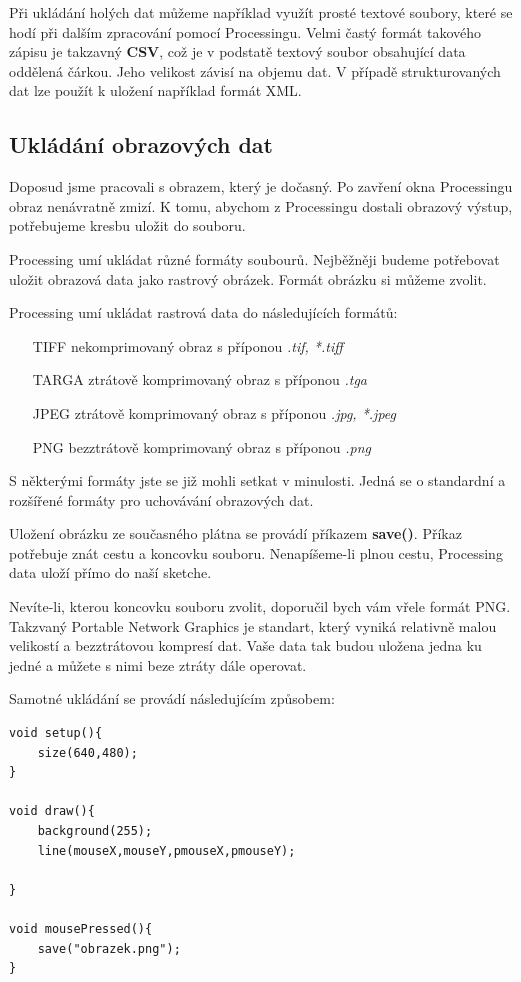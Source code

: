 \documentclass[10pt]{book}
\newcommand{\pododdil}[1]{\subsection{#1}\index{#1}\label{#1}}
\newcommand{\slovnik}[1]{\textbf{\gls{#1}}\index{#1}\label{#1}}
\begin{document}
Při ukládání holých dat můžeme například využít prosté textové soubory, které se hodí při dalším zpracování pomocí Processingu. Velmi častý formát takového zápisu je takzavný \slovnik{CSV}, což je v podstatě textový soubor obsahující data oddělená čárkou. Jeho velikost závisí na objemu dat. V případě strukturovaných dat lze použít k uložení například formát XML.


\pododdil{Ukládání obrazových dat}

Doposud jsme pracovali s obrazem, který je dočasný. Po zavření okna Processingu obraz nenávratně zmizí. K tomu, abychom z Processingu dostali obrazový výstup, potřebujeme kresbu uložit do souboru.

Processing umí ukládat různé formáty soubourů. Nejběžněji budeme potřebovat uložit obrazová data jako rastrový obrázek. Formát obrázku si můžeme zvolit.

Processing umí ukládat rastrová data do následujících formátů:


\begin{itemize}
\item[TIFF]
nekomprimovaný obraz s příponou {\em *.tif, *.tiff}
\item[TARGA]
ztrátově komprimovaný obraz s příponou {\em *.tga}
\item[JPEG]
ztrátově komprimovaný obraz s příponou {\em *.jpg, *.jpeg}
\item[PNG]
bezztrátově komprimovaný obraz s příponou {\em *.png}

\end{itemize}

S některými formáty jste se již mohli setkat v minulosti. Jedná se o standardní a rozšířené formáty pro uchovávání obrazových dat.

Uložení obrázku ze současného plátna se provádí příkazem \slovnik{save()}. Příkaz potřebuje znát cestu a koncovku souboru. Nenapíšeme-li plnou cestu, Processing data uloží přímo do naší sketche.

Nevíte-li, kterou koncovku souboru zvolit, doporučil bych vám vřele formát PNG. Takzvaný Portable Network Graphics je standart, který vyniká relativně malou velikostí a bezztrátovou kompresí dat. Vaše data tak budou uložena jedna ku jedné a můžete s nimi beze ztráty dále operovat. 

Samotné ukládání se provádí následujícím způsobem:

\begin{lstlisting} 
void setup(){
	size(640,480);
}

void draw(){
	background(255);
	line(mouseX,mouseY,pmouseX,pmouseY);

}

void mousePressed(){
	save("obrazek.png");
}

\end{lstlisting}
\end{document}
